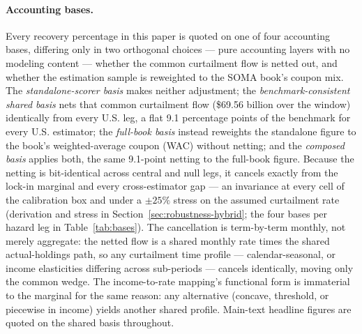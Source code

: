 \documentclass[12pt]{article}
\begin{document}
\paragraph{Accounting bases.} Every recovery percentage in this paper is quoted on one of four accounting bases, differing only in two orthogonal choices --- pure accounting layers with no modeling content --- whether the common curtailment flow is netted out, and whether the estimation sample is reweighted to the SOMA book's coupon mix. The \emph{standalone-scorer basis} makes neither adjustment; the \emph{benchmark-consistent shared basis} nets that common curtailment flow (\$69.56 billion over the window) identically from every U.S. leg, a flat 9.1 percentage points of the benchmark for every U.S. estimator; the \emph{full-book basis} instead reweights the standalone figure to the book's weighted-average coupon (WAC) without netting; and the \emph{composed basis} applies both, the same 9.1-point netting to the full-book figure. Because the netting is bit-identical across central and null legs, it cancels exactly from the lock-in marginal and every cross-estimator gap --- an invariance at every cell of the calibration box and under a $\pm 25\%$ stress on the assumed curtailment rate (derivation and stress in Section~\ref{sec:robustness-hybrid}; the four bases per hazard leg in Table~\ref{tab:bases}). The cancellation is term-by-term monthly, not merely aggregate: the netted flow is a shared monthly rate times the shared actual-holdings path, so any curtailment time profile --- calendar-seasonal, or income elasticities differing across sub-periods --- cancels identically, moving only the common wedge. The income-to-rate mapping's functional form is immaterial to the marginal for the same reason: any alternative (concave, threshold, or piecewise in income) yields another shared profile. Main-text headline figures are quoted on the shared basis throughout.
\end{document}
